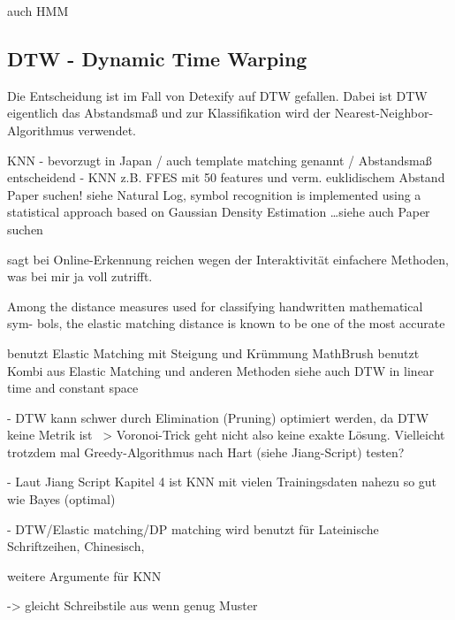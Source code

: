\cite{Oksuz:2008p11363} auch HMM

\subsection[DTW]{DTW - Dynamic Time Warping}
\label{sub:dtw}

Die Entscheidung ist im Fall von Detexify auf \ac{DTW} gefallen. Dabei ist \ac{DTW} eigentlich das Abstandsmaß und zur Klassifikation wird der Nearest-Neighbor-Algorithmus verwendet.

KNN - bevorzugt in Japan \cite{Jaeger:2003p1097} / auch template matching genannt / Abstandsmaß entscheidend
- KNN z.B. FFES mit 50 features und verm. euklidischem Abstand \TODO Paper suchen! siehe \cite{Vuong:2010p10279}
Natural Log, symbol recognition is implemented using a statistical approach based on Gaussian Density Estimation \dots siehe auch \cite{Vuong:2010p10279} \TODO Paper suchen

\citet{Tappert:1990p10302} sagt bei Online-Erkennung reichen wegen der Interaktivität einfachere Methoden, was bei mir ja voll zutrifft.

Among the distance measures used for classifying handwritten mathematical sym- bols, the elastic matching distance is known to be one of the most accurate \cite{Golubitsky:2009p2433}

\cite{Vuong:2010p10279} benutzt Elastic Matching mit Steigung und Krümmung
MathBrush \cite{Labahn:2008p10301} benutzt Kombi aus Elastic Matching und anderen Methoden siehe auch \cite{MacLean:2010p9970} DTW in linear time and constant space

- DTW kann schwer durch Elimination (Pruning) optimiert werden, da DTW keine Metrik ist ~> Voronoi-Trick geht nicht also keine exakte Lösung. Vielleicht trotzdem mal Greedy-Algorithmus nach Hart (siehe Jiang-Script) testen?

- Laut Jiang Script Kapitel 4 ist KNN mit vielen Trainingsdaten nahezu so gut wie Bayes (optimal)

- DTW/Elastic matching/DP matching wird benutzt für Lateinische Schriftzeihen, Chinesisch, \cite{Tappert:1990p10302}

weitere Argumente für KNN

-> gleicht Schreibstile aus wenn genug Muster

